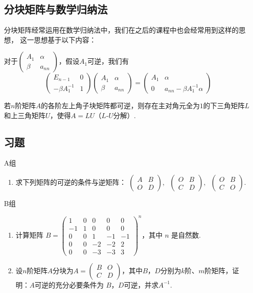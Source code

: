 \subsection{分块矩阵与数学归纳法}
分块矩阵经常运用在数学归纳法中，我们在之后的课程中也会经常用到这样的思想，
这一思想基于以下内容：

对于$\begin{pmatrix}
	A_1 & \alpha \\ \beta & a_{nn}
\end{pmatrix}$，假设$A_1$可逆，我们有
$$\begin{pmatrix}
	E_{n-1} & 0 \\ -\beta A_1^{-1} & 1
\end{pmatrix}\begin{pmatrix}
	A_1 & \alpha \\ \beta & a_{nn}
\end{pmatrix}=\begin{pmatrix}
	A_1 & \alpha \\ 0 & a_{nn}-\beta A_1^{-1}\alpha
\end{pmatrix}$$

\begin{example}
	若$n$阶矩阵$A$的各阶左上角子块矩阵都可逆，则存在主对角元全为$1$的下三角矩阵$L$和上三角矩阵$U$，使得$A=LU$（$L$-$U$分解）.
\end{example}

\subsection{习题}
\centerline{\heiti A组}
\begin{enumerate}
	\item 求下列矩阵的可逆的条件与逆矩阵：
	$\begin{pmatrix}
		A & B \\ O & D
	\end{pmatrix},\ $
	$\begin{pmatrix}
		O & B \\ C & D
	\end{pmatrix},\ $
	$\begin{pmatrix}
		O & B \\ C & O	
	\end{pmatrix}$.
\end{enumerate}
\centerline{\heiti B组}
\begin{enumerate}
	\item 计算矩阵 $B=\begin{pmatrix}1 & 0 & 0 & 0 & 0 \\ -1 & 1 & 0 & 0 & 0 \\ 0 & 0 & 1 & -1 & -1 \\ 0 & 0 & -2 & -2 & 2 \\ 0 & 0 & -3 & -3 & 3\end{pmatrix}^n$，其中 $n$ 是自然数.
	\item 设$n$阶矩阵$A$分块为$A=\begin{pmatrix}
		B & O \\ C & D
	\end{pmatrix}$，其中$B$，$D$分别为$k$阶、$m$阶矩阵，证明：$A$可逆的充分必要条件为
	$B$，$D$可逆，并求$A^{-1}$.
\end{enumerate}

